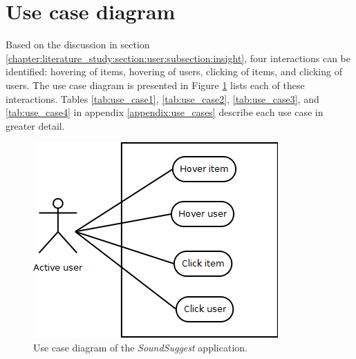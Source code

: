 \section{Use case diagram}

Based on the discussion in section \ref{chapter:literature_study:section:user:subsection:insight}, four interactions can be identified: hovering of items, hovering of users, clicking of items, and clicking of users. The use case diagram is presented in Figure \ref{fig:use_case_diagram} lists each of these interactions. Tables \ref{tab:use_case1}, \ref{tab:use_case2}, \ref{tab:use_case3}, and \ref{tab:use_case4} in appendix \ref{appendix:use_cases} describe each use case in greater detail.

\begin{figure}
  \begin{center}
  \includegraphics[scale=0.7]{img/usecase_diagram}
	\end{center}
  \caption{Use case diagram of the \emph{SoundSuggest} application.}
  \label{fig:use_case_diagram}
\end{figure}






